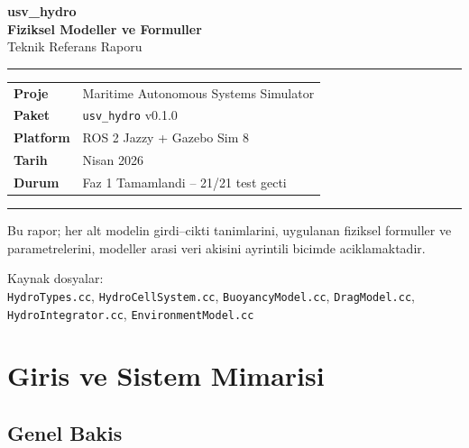 \documentclass[12pt,a4paper]{article}
\begin{document}
\begin{titlepage}
  \centering
  \vspace*{2cm}
  {\Huge\bfseries usv\_hydro}\\[0.4em]
  {\Large\bfseries Fiziksel Modeller ve Formuller}\\[0.3em]
  {\large Teknik Referans Raporu}
  \vspace{1.5cm}

  \rule{0.85\linewidth}{1pt}
  \vspace{0.5cm}

  \begin{tabular}{ll}
    \textbf{Proje}    & Maritime Autonomous Systems Simulator \\
    \textbf{Paket}    & \texttt{usv\_hydro} v0.1.0 \\
    \textbf{Platform} & ROS 2 Jazzy + Gazebo Sim 8 \\
    \textbf{Tarih}    & Nisan 2026 \\
    \textbf{Durum}    & Faz 1 Tamamlandi -- 21/21 test gecti \\
  \end{tabular}

  \vspace{1.5cm}\rule{0.85\linewidth}{0.4pt}\vspace{0.8cm}

  {\small Bu rapor; her alt modelin girdi--cikti tanimlarini, uygulanan
  fiziksel formuller ve parametrelerini, modeller arasi veri akisini
  ayrintili bicimde aciklamaktadir.}

  \vfill
  {\footnotesize Kaynak dosyalar:\\
  \texttt{HydroTypes.cc}, \texttt{HydroCellSystem.cc},
  \texttt{BuoyancyModel.cc}, \texttt{DragModel.cc},
  \texttt{HydroIntegrator.cc}, \texttt{EnvironmentModel.cc}}
\end{titlepage}

\tableofcontents
\newpage

\section{Giris ve Sistem Mimarisi}

\subsection{Genel Bakis}
\end{document}
